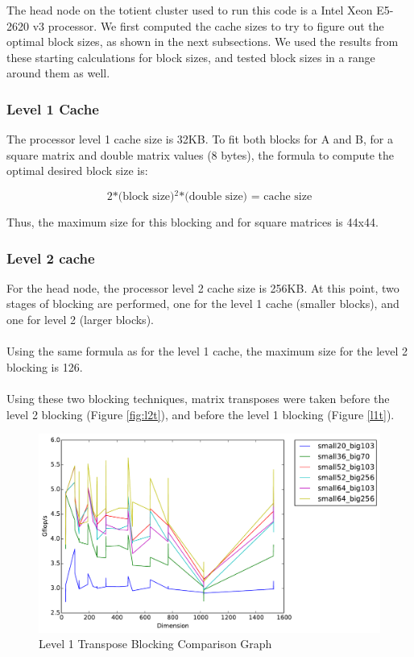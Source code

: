 \documentclass[letterpaper]{article}	 %
\begin{document}
\noindent The head node on the totient cluster used to run this code is a Intel Xeon E5-2620 v3 processor. We first computed the cache sizes to try to figure out the optimal block sizes, as shown in the next subsections. We used the results from these starting calculations for block sizes, and tested block sizes in a range around them as well. 


\subsubsection{Level 1 Cache}
The processor level 1 cache size is 32KB. To fit both blocks for A and B, for a square matrix and double matrix values (8 bytes), the formula to compute the optimal desired block size is:

\begin{equation}
\text{2*(block size)$^2$*(double size) = cache size}
\end{equation}

\noindent Thus, the maximum size for this blocking and for square matrices is 44x44.

\subsubsection{Level 2 cache}
For the head node, the processor level 2 cache size is 256KB. At this point, two stages of blocking are performed, one for the level 1 cache (smaller blocks), and one for level 2 (larger blocks). \\ \\

Using the same formula as for the level 1 cache, the maximum size for the level 2 blocking is 126. \\ \\

Using these two blocking techniques, matrix transposes were taken before the level 2 blocking (Figure \ref{fig:l2t}), and before the level 1 blocking (Figure \ref{l1t}). 

\begin{figure}[H]
\centering
  \centering
  \includegraphics[width=.6\linewidth]{timing-blocksizes-inittranspose.pdf}
  \caption{Level 1 Transpose Blocking Comparison Graph}
  \label{fig:l1t}
  \end{figure}
\end{document}
